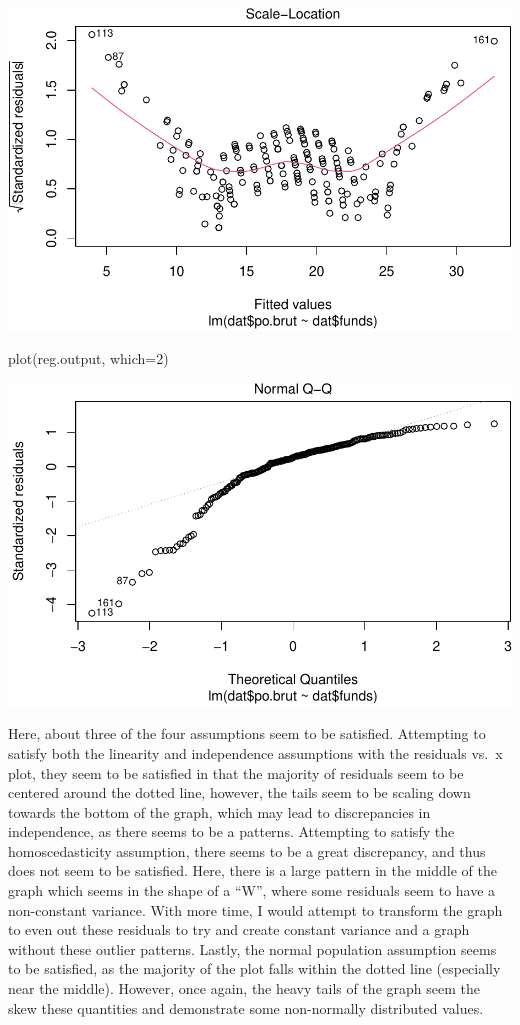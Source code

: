 \documentclass[
]{article}
\newenvironment{Shaded}{\begin{snugshade}}{\end{snugshade}}
\newcommand{\AttributeTok}[1]{\textcolor[rgb]{0.77,0.63,0.00}{#1}}
\newcommand{\DecValTok}[1]{\textcolor[rgb]{0.00,0.00,0.81}{#1}}
\newcommand{\FunctionTok}[1]{\textcolor[rgb]{0.00,0.00,0.00}{#1}}
\newcommand{\NormalTok}[1]{#1}
\begin{document}
\includegraphics{Journal_files/figure-latex/unnamed-chunk-44-2.pdf}

\begin{Shaded}
\begin{Highlighting}[]
\FunctionTok{plot}\NormalTok{(reg.output, }\AttributeTok{which=}\DecValTok{2}\NormalTok{)}
\end{Highlighting}
\end{Shaded}

\includegraphics{Journal_files/figure-latex/unnamed-chunk-44-3.pdf}

Here, about three of the four assumptions seem to be satisfied.
Attempting to satisfy both the linearity and independence assumptions
with the residuals vs.~x plot, they seem to be satisfied in that the
majority of residuals seem to be centered around the dotted line,
however, the tails seem to be scaling down towards the bottom of the
graph, which may lead to discrepancies in independence, as there seems
to be a patterns. Attempting to satisfy the homoscedasticity assumption,
there seems to be a great discrepancy, and thus does not seem to be
satisfied. Here, there is a large pattern in the middle of the graph
which seems in the shape of a ``W'', where some residuals seem to have a
non-constant variance. With more time, I would attempt to transform the
graph to even out these residuals to try and create constant variance
and a graph without these outlier patterns. Lastly, the normal
population assumption seems to be satisfied, as the majority of the plot
falls within the dotted line (especially near the middle). However, once
again, the heavy tails of the graph seem the skew these quantities and
demonstrate some non-normally distributed values.
\end{document}
